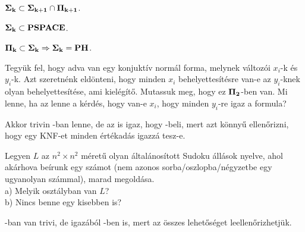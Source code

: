 \begin{Exercise}[counter={sorszam}, difficulty=0]
	$\mbox{\ensuremath{\mathbf{\Sigma_k}}}\subset \mbox{\ensuremath{\mathbf{\Sigma_{k+1}}}}\cap\mbox{\ensuremath{\mathbf{\Pi_{k+1}}}}$.
\end{Exercise}

\begin{Exercise}[counter={sorszam}, difficulty=0]
	$\mbox{\ensuremath{\mathbf{\Sigma_k}}}\subset\mbox{\ensuremath{\mathbf{PSPACE}}}$.
\end{Exercise}	

\begin{Exercise}[counter={sorszam}, difficulty=0]
	$\mbox{\ensuremath{\mathbf{\Pi_k}}}\subset\mbox{\ensuremath{\mathbf{\Sigma_k}}} \Rightarrow \mbox{\ensuremath{\mathbf{\Sigma_k}}}=\mbox{\ensuremath{\mathbf{PH}}}$.
\end{Exercise}	

\begin{Exercise}[counter={sorszam}, difficulty=0]
	Tegy\"uk fel, hogy adva van egy konjukt\'iv norm\'al forma, melynek v\'altoz\'oi $x_i$-k \'es $y_i$-k. Azt szeretn\'enk eld\"onteni, hogy minden $x_i$ behelyettes\'it\'esre van-e az $y_i$-knek olyan behelyettes\'it\'ese, ami kiel\'eg\'it\H o. Mutassuk meg, hogy ez $\mbox{\ensuremath{\mathbf{\Pi_2}}}$-ben van. Mi lenne, ha az lenne a k\'erd\'es, hogy van-e $x_i$, hogy minden $y_i$-re igaz a formula?
\end{Exercise}	 
\begin{Answer}
	Akkor trivin \Sigmatwo-ban lenne, de az is igaz, hogy \NP-beli, mert azt k\"onny\H u ellen\H orizni, hogy egy KNF-et minden \'ert\'ekad\'as igazz\'a tesz-e.
\end{Answer}

\begin{Exercise}[counter={sorszam}, difficulty=0]
	Legyen $L$ az $n^2\times n^2$ m\'eret\H u olyan \'altal\'anos\'itott Sudoku \'all\'asok nyelve, ahol ak\'arhova be\'irunk egy sz\'amot (nem azonos sorba/oszlopba/n\'egyzetbe egy ugyanolyan sz\'ammal), marad megold\'asa.\\
	a) Melyik oszt\'alyban van $L$?\\
	b) Nincs benne egy kisebben is?
\end{Exercise}	
\begin{Answer}
	\Pitwo-ban van trivi, de igaz\'ab\'ol \Sigmaone-ben is, mert az \"osszes lehet\H os\'eget leellen\H orizhetj\"uk.
\end{Answer}

